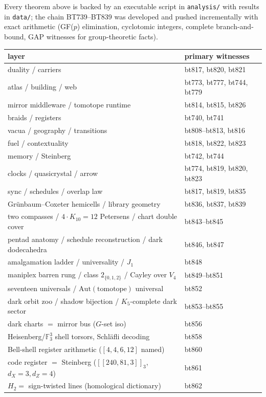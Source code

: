 \documentclass[11pt]{article}
\newcommand{\GF}[1]{\mathbb{F}_{#1}}
\begin{document}
Every theorem above is backed by an executable script in
\texttt{analysis/} with results in \texttt{data/}; the chain
BT739--BT839 was developed and pushed incrementally with exact
arithmetic (GF($p$) elimination, cyclotomic integers, complete
branch-and-bound, GAP witnesses for group-theoretic facts).

\begin{center}\small
\begin{tabular}{ll}
\toprule
layer & primary witnesses\\
\midrule
duality / carriers & bt817, bt820, bt821\\
atlas / building / web & bt773, bt777, bt744, bt779\\
mirror middleware / tomotope runtime & bt814, bt815, bt826\\
braids / registers & bt740, bt741\\
vacua / geography / transitions & bt808--bt813, bt816\\
fuel / contextuality & bt818, bt822, bt823\\
memory / Steinberg & bt742, bt744\\
clocks / quasicrystal / arrow & bt774, bt819, bt820, bt823\\
sync / schedules / overlap law & bt817, bt819, bt835\\
Gr\"unbaum--Coxeter hemicells / library geometry & bt836, bt837, bt839\\
two compasses / $4\cdot K_{10}=12$ Petersens / chart double cover & bt843--bt845\\
pentad anatomy / schedule reconstruction / dark dodecahedra & bt846, bt847\\
amalgamation ladder / universality / $J_1$ & bt848\\
maniplex barren rung / class $2_{\{0,1,2\}}$ / Cayley over $V_4$ & bt849--bt851\\
seventeen universals / $\mathrm{Aut}(\text{tomotope})$ universal & bt852\\
dark orbit zoo / shadow bijection / $K_5$-complete dark sector & bt853--bt855\\
dark charts $=$ mirror bus ($G$-set iso) & bt856\\
Heisenberg/$\GF3^3$ shell torsors, Schl\"afli decoding & bt858\\
Bell-shell register arithmetic ($[4,4,6,12]$ named) & bt860\\
code register $=$ Steinberg ($[[240,81,3]]_3$, $d_X=3,d_Z=4$) & bt861\\
$H_2=$ sign-twisted lines (homological dictionary) & bt862\\

\end{tabular}
\end{center}
\end{document}
